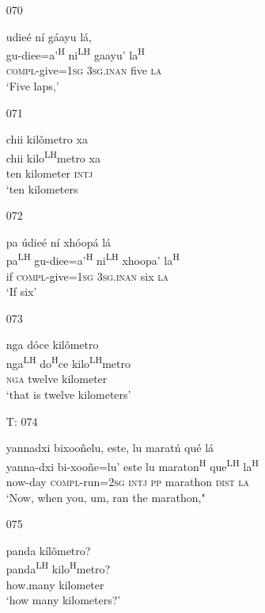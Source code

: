 \begin{itemize}
\item[070]
 
\glll   udie\'{e} n\'{i} g\'{a}ayu l\'{a},\\ 
 gu-diee=a'\textsuperscript{H} ni\textsuperscript{LH} gaayu' la\textsuperscript{H}\\
 \textsc{compl}-give=\textsc{1sg} \textsc{3sg.inan} five \textsc{la}\\
\glt `Five laps,'
 

\item[071]
 
\glll   chii kil\v{o}metro xa\\
chii kilo\textsuperscript{LH}metro xa\\
 ten kilometer \textsc{intj}\\
\glt `ten kilometers
 

\item[072]
 
\glll   pa \'{u}die\'{e} n\'{i} xh\'{o}op\'{a} l\'{a}\\
pa\textsuperscript{LH} gu-diee=a'\textsuperscript{H} ni\textsuperscript{LH} xhoopa' la\textsuperscript{H}\\
 if \textsc{compl}-give=\textsc{1sg} \textsc{3sg.inan} six \textsc{la}\\
\glt `If six'
 

\item[073]
 
\glll  nga d\'{o}ce kil\v{o}metro\\
nga\textsuperscript{LH} do\textsuperscript{H}ce kilo\textsuperscript{LH}metro\\
 \textsc{nga} twelve kilometer\\
\glt `that is twelve kilometers'
 

\item[T: 074]
 
\glll   yannadxi bixoo\~{n}elu, este, lu marat\'{n} qu\'{e} l\'{a}\\
 yanna-dxi bi-xoo\~{n}e=lu' este lu maraton\textsuperscript{H} que\textsuperscript{LH} la\textsuperscript{H}\\
 now-day \textsc{compl}-run=\textsc{2sg} \textsc{intj} \textsc{pp} marathon \textsc{dist} \textsc{la}\\
\glt `Now, when you, um, ran the marathon,"
 

\item[075]
 
\glll   panda k\'{i}l\v{o}metro?\\
panda\textsuperscript{LH} kilo\textsuperscript{H}metro?\\
 how.many kilometer\\
\glt `how many kilometers?'
 



\end{itemize}
